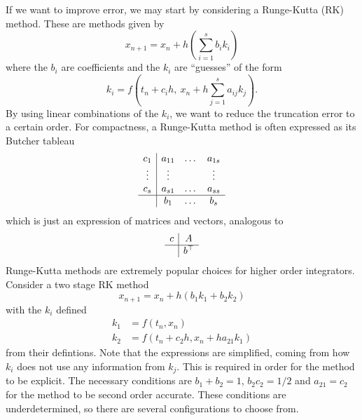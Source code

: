 \documentclass{report}
\theoremstyle{exampstyle} \newtheorem{example}[theorem]{Example}
\theoremstyle{exampstyle} \newtheorem{remark}[theorem]{Remark}
\theoremstyle{exampstyle} \newtheorem{definition}[theorem]{Definition}
\theoremstyle{exampstyle} \newtheorem{lemma}[theorem]{Lemma}
\begin{document}
If we want to improve error, we may start by considering a Runge-Kutta (RK) method.
These are methods given by
\begin{equation*}
	x_{n+1} = x_n + h \left( \sum_{i = 1}^{s} b_i k_i \right)
\end{equation*}
where the $b_i$ are coefficients and the $k_i$ are ``guesses'' of the form
\begin{equation*}
	k_i = f \left( t_n + c_i h,~ x_n + h\sum_{j = 1}^{s} a_{ij}k_j \right).	
\end{equation*}
By using linear combinations of the $k_i$, we want to reduce the truncation error to a certain order.
For compactness, a Runge-Kutta method is often expressed as its Butcher tableau
\begin{equation*}
	\begin{array}{c|ccc}
		c_1  &a_{11} &\dots &a_{1s} \\
		\vdots &\vdots & &\vdots \\
		c_s &a_{s1} &\dots &a_{ss} \\
		\hline
		&b_1 &\dots &b_s
	\end{array}
\end{equation*}
which is just an expression of matrices and vectors, analogous to
\begin{equation*}
    \begin{array}{c|c}
		c  &A \\
		\hline
		&b^\top
	\end{array}
\end{equation*}
Runge-Kutta methods are extremely popular choices for higher order integrators.
Consider a two stage RK method
\begin{equation*}
    x_{n+1} = x_n + h (b_1 k_1 + b_2 k_2)
\end{equation*}
with the $k_i$ defined
\begin{equation*}
    \begin{aligned}
        k_1 &= f \left( t_n, x_n \right) \\
        k_2 &= f \left( t_n + c_2 h, x_n + h a_{21}k_1 \right)
    \end{aligned}
\end{equation*}
from their defintions. Note that the expressions are simplified, coming from how $k_i$ does not use any information from $k_j$.
This is required in order for the method to be explicit.
The necessary conditions \cite{iserles2009rk} are $b_1 + b_2 = 1$, $b_2 c_2 = 1/2$ and $a_{21} = c_2$ for the method to be second order accurate.
These conditions are underdetermined, so there are several configurations to choose from.
\end{document}
